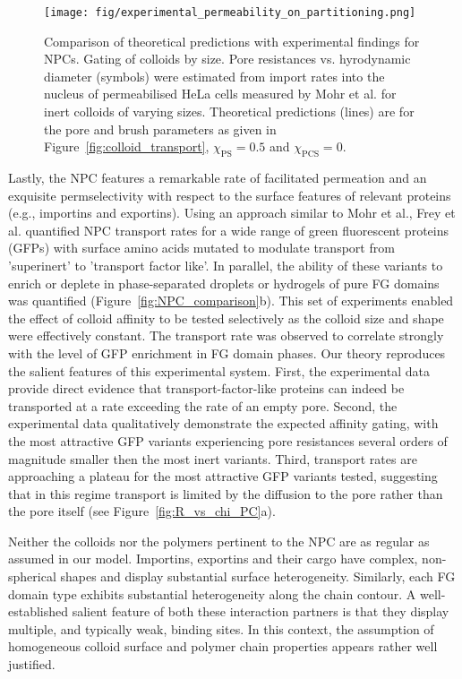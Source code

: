 \documentclass[12pt, a4paper]{article}
\begin{document}
\begin{figure}
    \centering
    \texttt{[image: fig/experimental\_permeability\_on\_partitioning.png]}
    \caption{
    Comparison of theoretical predictions with experimental findings for NPCs. Gating of colloids by size.
    Pore resistances vs. hyrodynamic diameter (symbols) were estimated from import rates into the nucleus of permeabilised HeLa cells measured by Mohr et al. for inert colloids of varying sizes.
    Theoretical predictions (lines) are for the pore and brush parameters as given in Figure~\ref{fig:colloid_transport}, $\chi_{\text{PS}} = 0.5$ and $\chi_{\text{PCS}} = 0$.
    }
    \label{fig:NPC_attr_comparison}
\end{figure}

Lastly, the NPC features a remarkable rate of facilitated permeation and an exquisite permselectivity with respect to the surface features of relevant proteins (e.g., importins and exportins).
Using an approach similar to Mohr et al., Frey et al. quantified NPC transport rates for a wide range of green fluorescent proteins (GFPs) with surface amino acids mutated to modulate transport from 'superinert' to 'transport factor like'.
In parallel, the ability of these variants to enrich or deplete in phase-separated droplets or hydrogels of pure FG domains was quantified (Figure~\ref{fig:NPC_comparison}b).
This set of experiments enabled the effect of colloid affinity to be tested selectively as the colloid size and shape were effectively constant.
The transport rate was observed to correlate strongly with the level of GFP enrichment in FG domain phases.
Our theory reproduces the salient features of this experimental system.
First, the experimental data provide direct evidence that transport-factor-like proteins can indeed be transported at a rate exceeding the rate of an empty pore.
Second, the experimental data qualitatively demonstrate the expected affinity gating, with the most attractive GFP variants experiencing pore resistances several orders of magnitude smaller then the most inert variants.
Third, transport rates are approaching a plateau for the most attractive GFP variants tested, suggesting that in this regime transport is limited by the diffusion to the pore rather than the pore itself (see Figure~\ref{fig:R_vs_chi_PC}a).

Neither the colloids nor the polymers pertinent to the NPC are as regular as assumed in our model.
Importins, exportins and their cargo have complex, non-spherical shapes and display substantial surface heterogeneity.
Similarly, each FG domain type exhibits substantial heterogeneity along the chain contour.
A well-established salient feature of both these interaction partners is that they display multiple, and typically weak, binding sites. In this context, the assumption of homogeneous colloid surface and polymer chain properties appears rather well justified. 
\end{document}
